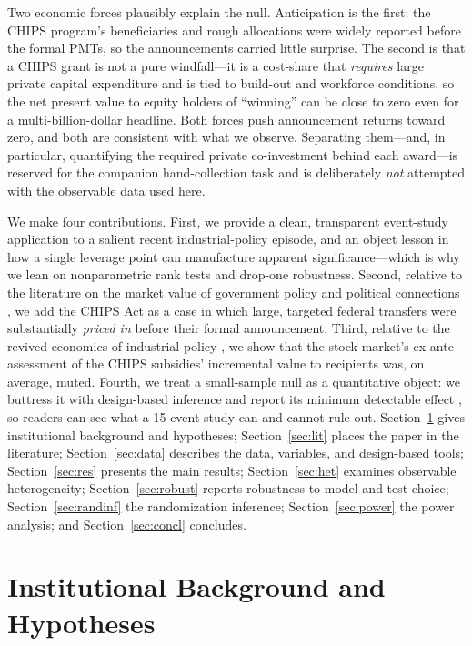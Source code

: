 \documentclass[12pt]{article}
\begin{document}
Two economic forces plausibly explain the null. Anticipation is the first: the CHIPS
program's beneficiaries and rough allocations were widely reported before the formal PMTs,
so the announcements carried little surprise. The second is that a CHIPS grant is not a pure
windfall---it is a cost-share that \emph{requires} large private capital expenditure and is
tied to build-out and workforce conditions, so the net present value to equity holders of
``winning'' can be close to zero even for a multi-billion-dollar headline. Both forces push
announcement returns toward zero, and both are consistent with what we observe. Separating
them---and, in particular, quantifying the required private co-investment behind each
award---is reserved for the companion hand-collection task and is deliberately \emph{not}
attempted with the observable data used here.

We make four contributions. First, we provide a clean, transparent event-study application to
a salient recent industrial-policy episode, and an object lesson in how a single leverage point
can manufacture apparent significance---which is why we lean on nonparametric rank tests
\citep{corrado1989,cowan1992} and drop-one robustness. Second, relative to the literature on the
market value of government policy and political connections
\citep{schwert1981,binder1985,goldman2009,cooper2010,belo2013}, we add the CHIPS Act as a case in
which large, targeted federal transfers were substantially \emph{priced in} before their formal
announcement. Third, relative to the revived economics of industrial policy
\citep{criscuolo2019,slattery2020,juhasz2024}, we show that the stock market's ex-ante assessment
of the CHIPS subsidies' incremental value to recipients was, on average, muted. Fourth, we treat
a small-sample null as a quantitative object: we buttress it with design-based inference
\citep{young2019} and report its minimum detectable effect \citep{abadie2020}, so readers can see
what a 15-event study can and cannot rule out. Section~\ref{sec:bg} gives institutional background
and hypotheses; Section~\ref{sec:lit} places the paper in the literature; Section~\ref{sec:data}
describes the data, variables, and design-based tools; Section~\ref{sec:res} presents the main
results; Section~\ref{sec:het} examines observable heterogeneity; Section~\ref{sec:robust} reports
robustness to model and test choice; Section~\ref{sec:randinf} the randomization inference;
Section~\ref{sec:power} the power analysis; and Section~\ref{sec:concl} concludes.

\section{Institutional Background and Hypotheses}\label{sec:bg}
\end{document}

